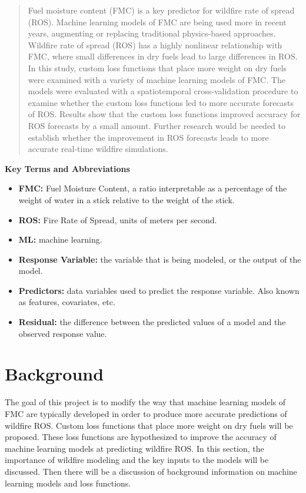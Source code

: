 \documentclass[11pt]{article}%
\begin{document}
\begin{abstract}
Fuel moisture content (FMC) is a key predictor for wildfire rate of spread (ROS). Machine learning models of FMC are being used more in recent years, augmenting or replacing traditional physics-based approaches. Wildfire rate of spread (ROS) has a highly nonlinear relationship with FMC, where small differences in dry fuels lead to large differences in ROS. In this study, custom loss functions that place more weight on dry fuels were examined with a variety of machine learning models of FMC. The models were evaluated with a spatiotemporal cross-validation procedure to examine whether the custom loss functions led to more accurate forecasts of ROS. Results show that the custom loss functions improved accuracy for ROS forecasts by a small amount. Further research would be needed to establish whether the improvement in ROS forecasts leads to more accurate real-time wildfire simulations.
\end{abstract}

\textbf{Key Terms and Abbreviations}
\begin{itemize}
    \item \textbf{FMC:} Fuel Moisture Content, a ratio interpretable as a percentage of the weight of water in a stick relative to the weight of the stick.
    \item \textbf{ROS:} Fire Rate of Spread, units of meters per second.
    \item \textbf{ML:} machine learning.
    \item \textbf{Response Variable:} the variable that is being modeled, or the output of the model.
    \item \textbf{Predictors:} data variables used to predict the response variable. Also known as features, covariates, etc.
    \item \textbf{Residual:} the difference between the predicted values of a model and the observed response value.
\end{itemize}


\newpage
\tableofcontents
\newpage

\section{Background}

The goal of this project is to modify the way that machine learning models of FMC are typically developed in order to produce more accurate predictions of wildfire ROS. Custom loss functions that place more weight on dry fuels will be proposed. These loss functions are hypothesized to improve the accuracy of machine learning models at predicting wildfire ROS. In this section, the importance of wildfire modeling and the key inputs to the models will be discussed. Then there will be a discussion of background information on machine learning models and loss functions.
\end{document}
